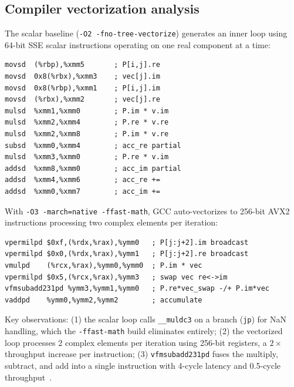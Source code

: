 \documentclass[a4paper,noarxiv]{quantumarticle}
\begin{document}
\subsection{Compiler vectorization analysis}
\label{sec:asm}

The scalar baseline (\texttt{-O2 -fno-tree-vectorize}) generates an inner
loop using 64-bit SSE scalar instructions operating on one real component at
a time:

\begin{lstlisting}[language={[x86masm]Assembler},
  caption={Inner loop of \texttt{lb\_propagate\_step} at
           \texttt{-O2 -fno-tree-vectorize} (12 instructions per complex
           element).},
  label={lst:scalar}]
movsd  (%rbp),%xmm5       ; P[i,j].re
movsd  0x8(%rbx),%xmm3    ; vec[j].im
movsd  0x8(%rbp),%xmm1    ; P[i,j].im
movsd  (%rbx),%xmm2       ; vec[j].re
mulsd  %xmm1,%xmm0        ; P.im * v.im
mulsd  %xmm2,%xmm4        ; P.re * v.re
mulsd  %xmm2,%xmm8        ; P.im * v.re
subsd  %xmm0,%xmm4        ; acc_re partial
mulsd  %xmm3,%xmm0        ; P.re * v.im
addsd  %xmm8,%xmm0        ; acc_im partial
addsd  %xmm4,%xmm6        ; acc_re +=
addsd  %xmm0,%xmm7        ; acc_im +=
\end{lstlisting}

With \texttt{-O3 -march=native -ffast-math}, GCC auto-vectorizes to 256-bit
AVX2 instructions processing two complex elements per iteration:

\begin{lstlisting}[language={[x86masm]Assembler},
  caption={Inner loop at \texttt{-O3 -march=native -ffast-math}
           (6 instructions per 2 complex elements). The
           \texttt{vfmsubadd231pd} instruction is the key enabler.},
  label={lst:avx2}]
vpermilpd $0xf,(%rdx,%rax),%ymm0   ; P[j:j+2].im broadcast
vpermilpd $0x0,(%rdx,%rax),%ymm1   ; P[j:j+2].re broadcast
vmulpd    (%rcx,%rax),%ymm0,%ymm0  ; P.im * vec
vpermilpd $0x5,(%rcx,%rax),%ymm3   ; swap vec re<->im
vfmsubadd231pd %ymm3,%ymm1,%ymm0   ; P.re*vec_swap -/+ P.im*vec
vaddpd    %ymm0,%ymm2,%ymm2        ; accumulate
\end{lstlisting}

Key observations: (1) the scalar loop calls \texttt{\_\_muldc3} on a
branch (\texttt{jp}) for NaN handling, which the
\texttt{-ffast-math} build eliminates entirely;
(2) the vectorized loop processes 2 complex elements per iteration using
256-bit registers, a $2\times$ throughput increase per instruction;
(3) \texttt{vfmsubadd231pd} fuses the multiply, subtract, and add into a
single instruction with 4-cycle latency and 0.5-cycle
throughput~\cite{IntelIntrinsics}.
\end{document}
